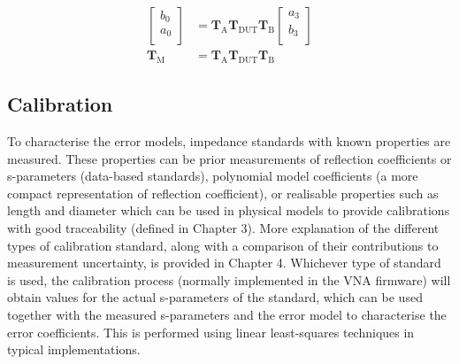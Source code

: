 \documentclass[../thesis/thesis.tex]{subfiles}
\begin{document}
\begin{refsection}

\begin{align}
	\begin{bmatrix}
		b_0 \\
		a_0 \\
	\end{bmatrix}
	&=\mathbf{T}_\textrm{A} \mathbf{T}_\textrm{DUT} \mathbf{T}_\textrm{B}
	\begin{bmatrix}
		a_3 \\
		b_3 \\
	\end{bmatrix} \\
	\mathbf{T}_\textrm{M} &= \mathbf{T}_\textrm{A}\mathbf{T}_\textrm{DUT}\mathbf{T}_\textrm{B}
\end{align}

\subsection{Calibration}

To characterise the error models, impedance standards with known properties are measured. These properties can be prior measurements of reflection coefficients or s-parameters (data-based standards), polynomial model coefficients (a more compact representation of reflection coefficient), or realisable properties such as length and diameter which can be used in physical models to provide calibrations with good traceability (defined in Chapter 3). More explanation of the different types of calibration standard, along with a comparison of their contributions to measurement uncertainty, is provided in Chapter 4. Whichever type of standard is used, the calibration process (normally implemented in the VNA firmware) will obtain values for the actual s-parameters of the standard, which can be used together with the measured s-parameters and the error model to characterise the error coefficients. This is performed using linear least-squares techniques in typical implementations.


\end{refsection}
\end{document}
